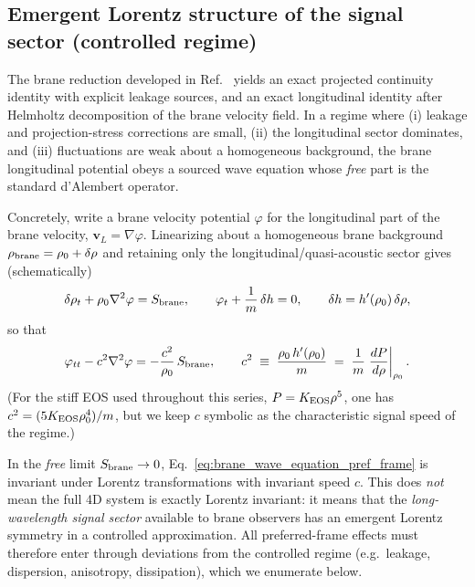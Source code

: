 \documentclass[11pt]{article}
\begin{document}
\subsection{Emergent Lorentz structure of the signal sector (controlled regime)}
\label{sec:preferred_frame_wave_sector}

The brane reduction developed in Ref.~\cite{norris2026_4d_model} yields an exact projected continuity
identity with explicit leakage sources, and an exact longitudinal identity after
Helmholtz decomposition of the brane velocity field. In a regime where
(i) leakage and projection-stress corrections are small, (ii) the longitudinal
sector dominates, and (iii) fluctuations are weak about a homogeneous background,
the brane longitudinal potential obeys a sourced wave equation whose \emph{free}
part is the standard d'Alembert operator.

Concretely, write a brane velocity potential $\varphi$ for the longitudinal part
of the brane velocity, $\mathbf v_L = \nabla \varphi$. Linearizing about a
homogeneous brane background $\rho_{\rm brane}=\rho_0+\delta\rho$ and retaining
only the longitudinal/quasi-acoustic sector gives (schematically)
\begin{equation}
\delta\rho_t + \rho_0 \nabla^2 \varphi = S_{\rm brane},
\qquad
\varphi_t + \frac{1}{m}\,\delta h = 0,
\qquad
\delta h = h'(\rho_0)\,\delta\rho,
\label{eq:lin_brane_acoustics_pref_frame}
\end{equation}
so that
\begin{equation}
\varphi_{tt} - c^2 \nabla^2 \varphi
= -\frac{c^2}{\rho_0}\,S_{\rm brane},
\qquad
c^2 \;\equiv\; \frac{\rho_0\,h'(\rho_0)}{m}
\;=\; \frac{1}{m}\left.\frac{dP}{d\rho}\right|_{\rho_0}.
\label{eq:brane_wave_equation_pref_frame}
\end{equation}
(For the stiff EOS used throughout this series, $P=K_{\rm EOS}\rho^5$, one has
$c^2 = (5K_{\rm EOS}\rho_0^4)/m$, but we keep $c$ symbolic as the characteristic signal
speed of the regime.)

In the \emph{free} limit $S_{\rm brane}\to 0$, Eq.~\eqref{eq:brane_wave_equation_pref_frame}
is invariant under Lorentz transformations with invariant speed $c$.
This does \emph{not} mean the full 4D system is exactly Lorentz invariant:
it means that the \emph{long-wavelength signal sector} available to brane observers
has an emergent Lorentz symmetry in a controlled approximation. All preferred-frame
effects must therefore enter through deviations from the controlled regime
(e.g.\ leakage, dispersion, anisotropy, dissipation), which we enumerate below.
\end{document}
